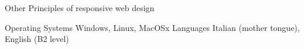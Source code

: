 \begin{cvskills}
\hline
\cvskill
{Other} %
{Principles of responsive web design} %

\hline
\cvskill
{Operating Systems} %
{Windows, Linux, MacOSx} %
\hline
\cvskill
{Languages} %
{Italian (mother tongue), English (B2 level)} %


\end{cvskills}
